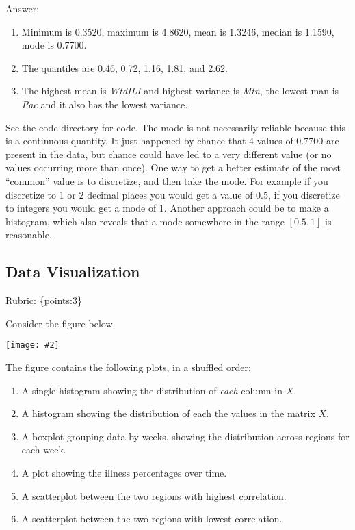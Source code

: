 \documentclass{article}
\def\ans#1{\par\gre{Answer: #1}}
\def\answer#1{\ans{#1}}
\def\rubric#1{\gre{Rubric: \{#1\}}}{}
\def\gre#1{{\color{gre}#1}}
\newcommand{\fig}[2]{\texttt{[image: \#2]}}
\def\enum#1{\begin{enumerate}#1\end{enumerate}}
\begin{document}
	\answer{
		\begin{enumerate}
			\item Minimum is 0.3520, maximum is 4.8620, mean is 1.3246, median is 1.1590, mode is 0.7700.
			\item The quantiles are 0.46, 0.72, 1.16, 1.81, and 2.62.
			\item The highest mean is \emph{WtdILI} and highest variance is \emph{Mtn}, the lowest man is \emph{Pac} and it also has the lowest variance.
		\end{enumerate}
		See the code directory for code. The mode is not necessarily reliable because this is a
		continuous quantity. It just happened by chance that 4 values of 0.7700 are present
		in the data, but chance could have led to a very different value (or no values
		occurring more than once). One way to get a better estimate of the most
		``common'' value is to discretize, and then take the mode.
		For example if you discretize to 1 or 2 decimal places you would get a
		value of 0.5, if you discretize to integers you would get a mode of 1.
		Another approach could be to make a histogram, which also reveals that
		a mode somewhere in the range $[0.5,1]$ is reasonable.
	}
	
	
	
	\subsection{Data Visualization}
	\rubric{points:3}
	
	Consider the figure below.
	
	\fig{1}{../figs/visualize-unlabeled}
	
	The figure contains the following plots, in a shuffled order:
	\enum{
		\item A single histogram showing the distribution of \emph{each} column in $X$.
		\item A histogram showing the distribution of each the values in the matrix $X$.
		\item A boxplot grouping data by weeks, showing the distribution across regions for each week.
		\item A plot showing the illness percentages over time.
		\item A scatterplot between the two regions with highest correlation.
		\item A scatterplot between the two regions with lowest correlation.
	}
	
\end{document}
